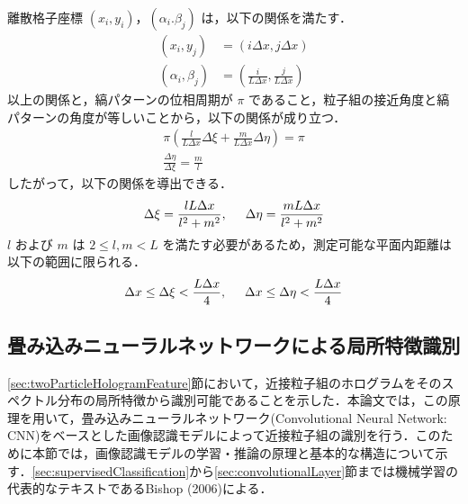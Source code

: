 離散格子座標 $(x_i,y_i)$，$(\alpha_i.\beta_j)$ は，以下の関係を満たす．
\begin{align}
    \left( x_i, y_j \right) &= \left( i \Delta x, j \Delta x \right) \\
    \left( \alpha_i, \beta_j \right) &= \left( \frac{i}{L\Delta x}, \frac{j}{L\Delta x} \right)
\end{align}
以上の関係と，縞パターンの位相周期が $\pi$ であること，粒子組の接近角度と縞パターンの角度が等しいことから，以下の関係が成り立つ．
\begin{gather}
    \pi \left( \frac{l}{L\Delta x} \Delta \xi + \frac{m}{L\Delta x} \Delta \eta \right) = \pi \\
    \frac{\Delta \eta}{\Delta \xi} = \frac{m}{l}
\end{gather}
したがって，以下の関係を導出できる\cite{aem2023}．
\begin{equation}
    \label{th:stripepattern}
    \Delta \xi = \frac{lL\Delta x}{l^2+m^2}, \hspace{5mm} \Delta \eta = \frac{m L\Delta x}{l^2+m^2}
\end{equation}
$l$ および $m$ は $2 \leq l, m < L$ を満たす必要があるため，測定可能な平面内距離は以下の範囲に限られる．
\begin{equation}
    \Delta x \leq \Delta \xi < \frac{L\Delta x}{4}, \hspace{5mm} \Delta x \leq \Delta \eta < \frac{L\Delta x}{4}
\end{equation}

\subsection{畳み込みニューラルネットワークによる局所特徴識別}\label{sec:convolutionalNeuralNetwork}
\ref{sec:twoParticleHologramFeature}節において，近接粒子組のホログラムをそのスペクトル分布の局所特徴から識別可能であることを示した．本論文では，この原理を用いて，畳み込みニューラルネットワーク(Convolutional Neural Network: CNN)\cite{lecun1998}をベースとした画像認識モデルによって近接粒子組の識別を行う．このために本節では，画像認識モデルの学習・推論の原理と基本的な構造について示す．\ref{sec:supervisedClassification}から\ref{sec:convolutionalLayer}節までは機械学習の代表的なテキストであるBishop (2006)による\cite{bishop2006}．

